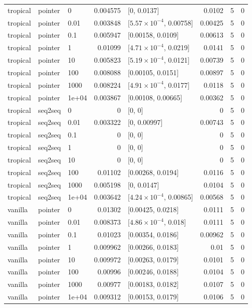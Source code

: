 \documentclass[10pt]{article}
\begin{document}
{\begin{longtable}{lllrlrrr}
tropical & pointer & 0 & 0.004575 & [0, 0.0137] & 0.0102 & 5 & 0\\
tropical & pointer & 0.01 & 0.003848 & [$5.57\times10^{-4}$, 0.00758] & 0.00425 & 5 & 0\\
tropical & pointer & 0.1 & 0.005947 & [0.00158, 0.0109] & 0.00613 & 5 & 0\\
tropical & pointer & 1 & 0.01099 & [$4.71\times10^{-4}$, 0.0219] & 0.0141 & 5 & 0\\
tropical & pointer & 10 & 0.005823 & [$5.19\times10^{-4}$, 0.0121] & 0.00739 & 5 & 0\\
tropical & pointer & 100 & 0.008088 & [0.00105, 0.0151] & 0.00897 & 5 & 0\\
tropical & pointer & 1000 & 0.008224 & [$4.91\times10^{-4}$, 0.0177] & 0.0118 & 5 & 0\\
tropical & pointer & 1e+04 & 0.003867 & [0.00108, 0.00665] & 0.00362 & 5 & 0\\
tropical & seq2seq & 0 & 0 & [0, 0] & 0 & 5 & 0\\
tropical & seq2seq & 0.01 & 0.003322 & [0, 0.00997] & 0.00743 & 5 & 0\\
tropical & seq2seq & 0.1 & 0 & [0, 0] & 0 & 5 & 0\\
tropical & seq2seq & 1 & 0 & [0, 0] & 0 & 5 & 0\\
tropical & seq2seq & 10 & 0 & [0, 0] & 0 & 5 & 0\\
tropical & seq2seq & 100 & 0.01102 & [0.00268, 0.0194] & 0.0116 & 5 & 0\\
tropical & seq2seq & 1000 & 0.005198 & [0, 0.0147] & 0.0104 & 5 & 0\\
tropical & seq2seq & 1e+04 & 0.003642 & [$4.24\times10^{-4}$, 0.00865] & 0.00568 & 5 & 0\\
vanilla & pointer & 0 & 0.01302 & [0.00425, 0.0218] & 0.0111 & 5 & 0\\
vanilla & pointer & 0.01 & 0.008373 & [$4.86\times10^{-4}$, 0.018] & 0.0111 & 5 & 0\\
vanilla & pointer & 0.1 & 0.01023 & [0.00354, 0.0186] & 0.00962 & 5 & 0\\
vanilla & pointer & 1 & 0.009962 & [0.00266, 0.0183] & 0.01 & 5 & 0\\
vanilla & pointer & 10 & 0.009972 & [0.00263, 0.0179] & 0.0101 & 5 & 0\\
vanilla & pointer & 100 & 0.00996 & [0.00246, 0.0188] & 0.0104 & 5 & 0\\
vanilla & pointer & 1000 & 0.00977 & [0.00183, 0.0182] & 0.0107 & 5 & 0\\
vanilla & pointer & 1e+04 & 0.009312 & [0.00153, 0.0179] & 0.0106 & 5 & 0\\

\end{longtable}}
\end{document}
